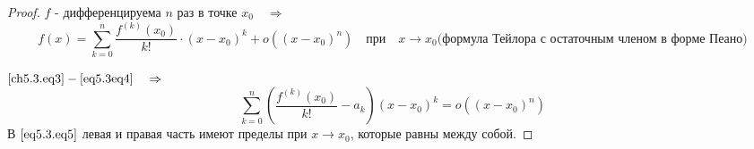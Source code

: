 \begin{proof}
$f$ - дифференцируема $n$ раз в точке $x_0 \quad \Rightarrow$ 
\begin{equation} \label{eq5.3eq4}
f(x) = \sum_{k = 0}^{n} \frac{f^{(k)}(x_0)}{k!} \cdot (x - x_0)^k + o((x - x_0)^n) \quad \text{при} \quad x \to x_0 \text{(формула Тейлора с остаточным членом в форме Пеано)}
\end{equation}

$\eqref{ch5.3.eq3} - \eqref{eq5.3eq4} \quad \Rightarrow$ 
\begin{equation} \label{eq5.3.eq5}
\sum\limits_{k = 0}^{n} \left( \frac{f^{(k)}(x_0)}{k!} - a_k \right) (x - x_0)^k = o((x - x_0)^n)
\end{equation}
В $\eqref{eq5.3.eq5}$ левая и правая часть имеют пределы при $x \to x_0$, которые равны между собой.
\end{proof}
